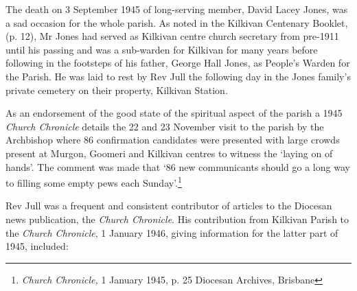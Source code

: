 The death on 3 September 1945 of long-serving member, David Lacey Jones,
was a sad occasion for the whole parish. As noted in the Kilkivan
Centenary Booklet, (p. 12), Mr Jones had served as Kilkivan centre
church secretary from pre-1911 until his passing and was a sub-warden
for Kilkivan for many years before following in the footsteps of his
father, George Hall Jones, as People's Warden for the Parish. He was
laid to rest by Rev Jull the following day in the Jones family's private
cemetery on their property, Kilkivan Station.

As an endorsement of the good state of the spiritual aspect of the
parish a 1945 \emph{Church Chronicle} details the 22 and 23 November
visit to the parish by the Archbishop where 86 confirmation candidates
were presented with large crowds present at Murgon, Goomeri and Kilkivan
centres to witness the `laying on of hands'. The comment was made that
`86 new communicants should go a long way to filling some empty pews
each Sunday'.\footnote{\emph{Church Chronicle,} 1 January 1945, p. 25
  Diocesan Archives, Brisbane}

Rev Jull was a frequent and consistent contributor of articles to the
Diocesan news publication, the \emph{Church Chronicle}. His contribution
from Kilkivan Parish to the \emph{Church Chronicle}, 1 January 1946,
giving information for the latter part of 1945, included:

